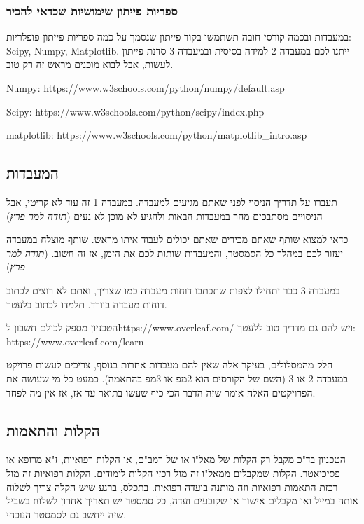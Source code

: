 \documentclass[a4paper,12pt]{article}
\begin{document}
\subsubsection{ספריות פייתון שימושיות שכדאי להכיר}

במעבדות ובכמה קורסי חובה תשתמשו בקוד פייתון שנסמך על כמה ספריות פייתון פופלריות: \textenglish{Scipy, Numpy, Matplotlib}. ייתנו לכם במעבדה 2 למידה בסיסית ובמעבדה 3 סדנת פייתון לעשות, אבל לבוא מוכנים מראש זה רק טוב.

\textenglish{Numpy: https://www.w3schools.com/python/numpy/default.asp}

\textenglish{Scipy: https://www.w3schools.com/python/scipy/index.php}

\textenglish{matplotlib: https://www.w3schools.com/python/matplotlib\_intro.asp}

\subsection{המעבדות}

תעברו על תדריך הניסוי לפני שאתם מגיעים למעבדה. במעבדה 1 זה עוד לא קריטי, אבל הניסויים מסתבכים מהר במעבדות הבאות ולהגיע לא מוכן לא נעים (\emph{תודה למר פרץ})

כדאי למצוא שותף שאתם מכירים שאתם יכולים לעבוד איתו מראש. שותף מוצלח במעבדה יעזור לכם במהלך כל הסמסטר, והמעבדות שותות לכם את הזמן, אז זה חשוב. (\emph{תודה למר פרץ})

במעבדה 3 כבר יתחילו לצפות שתכתבו דוחות מעבדה כמו שצריך, ואתם לא רוצים לכתוב דוחות מעבדה בוורד. תלמדו לכתוב בלעטך.

הטכניון מספק לכולם חשבון ל\textenglish{https://www.overleaf.com/} ויש להם גם מדריך טוב ללעטך:
\textenglish{https://www.overleaf.com/learn}

חלק מהמסלולים, בעיקר אלה שאין להם מעבדות אחרות בנוסף, צריכים לעשות פרויקט במעבדה 2 או 3 (השם של הקורסים הוא 2מפ או 3מפ בהתאמה). כמעט כל מי שעושה את הפרויקטים האלה אומר שזה הדבר הכי כיף שעשו בתואר עד אז, אז אין מה לפחד.

\subsection{הקלות והתאמות}

הטכניון בד"כ מקבל רק הקלות של מאל"ו או של רמב"ם, או הקלות רפואיות, ז"א מרופא או פסיכיאטר. הקלות שמקבלים ממאל"ו זה מול רכזי הקלות לימודים. הקלות רפואיות זה מול רכזת התאמות רפואיות וזה מותנה בועדה רפואית. בתכלס, ברגע שיש הקלה צריך לשלוח אותה במייל ואו מקבלים אישור או שקובעים ועדה, כל סמסטר יש תאריך אחרון לשלוח בשביל שזה ייחשב גם לסמסטר הנוכחי.
\end{document}
